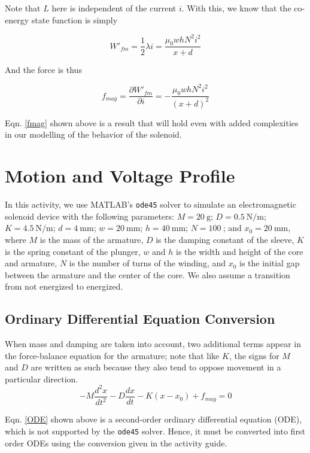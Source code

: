 \documentclass[conference]{IEEEtran}
\begin{document}
Note that $L$ here is independent of the current $i$. With this, we know that the co-energy state function is simply

\begin{equation*}
    W'_{fm} = \frac{1}{2} \lambda i = \frac{\mu_{0} wh N^{2}i^{2}}{x+d}
\end{equation*}

And the force is thus

\begin{equation} \label{fmag}
    f_{mag} = \frac{\partial W'_{fm}}{\partial i} = -\frac{\mu_{0} wh N^{2} i^{2}}{(x+d)^{2}}
\end{equation}

Eqn. \eqref{fmag} shown above is a result that will hold even with added complexities in our modelling of the behavior of the solenoid. 
\section{Motion and Voltage Profile}

In this activity, we use MATLAB's \texttt{ode45} solver to simulate an electromagnetic solenoid device with the following parameters: $M=\SI{20}{\gram}$; $D=\SI{0.5}{\newton\per\meter}$; $K=\SI{4.5}{\newton\per\meter}$; $d=\SI{4}{\milli\meter}$; $w=\SI{20}{\milli\meter}$; $h=\SI{40}{\milli\meter}$; $N=\SI{100}{}$; and $x_{0}=\SI{20}{\milli\meter}$, where $M$ is the mass of the armature, $D$ is the damping constant of the sleeve, $K$ is the spring constant of the plunger, $w$ and $h$ is the width and height of the core and armature, $N$ is the number of turns of the winding, and $x_{0}$ is the initial gap between the armature and the center of the core. We also assume a transition from not energized to energized.

\subsection{Ordinary Differential Equation Conversion}

When mass and damping are taken into account, two additional terms appear in the force-balance equation
for the armature; note that like $K$, the signs for $M$ and $D$ are written as such because they also tend to oppose movement in a particular direction.
\begin{equation} \label{ODE}
    -M\frac{d^{2}x}{dt^{2}} -D\frac{dx}{dt} -K(x-x_{0}) + f_{mag}=0 
\end{equation}

Eqn. \eqref{ODE} shown above is a second-order ordinary differential equation (ODE), which is not supported by the \texttt{ode45} solver. Hence, it must be converted into first order ODEs using the conversion given in the activity guide.
\end{document}

